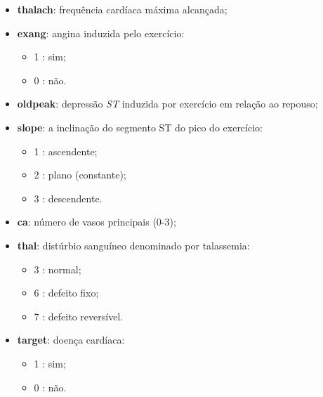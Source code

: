 \documentclass[a4paper]{report}
\begin{document}
{\begin{itemize}
\begin{itemize}
		\end{itemize}
	    \item \textbf{thalach}: frequência cardíaca máxima alcançada;
		\item \textbf{exang}: angina induzida pelo exercício:
		\begin{itemize}
			\item 1 : sim;
			\item 0 : não.
		\end{itemize}
	    \item \textbf{oldpeak}: depressão \textit{ST} induzida por exercício em relação ao repouso;
	    \item \textbf{slope}: a inclinação do segmento ST do pico do exercício:
	    \begin{itemize}
			\item 1 : ascendente;
			\item 2 : plano (constante);
			\item 3 : descendente.
		\end{itemize}
	    \item \textbf{ca}: número de vasos principais (0-3);
		\item \textbf{thal}: distúrbio sanguíneo denominado por talassemia:
		\begin{itemize}
			\item 3 : normal;
			\item 6 : defeito fixo;
			\item 7 : defeito reversível.
		\end{itemize}
	    \item \textbf{target}: doença cardíaca:
	    \begin{itemize}
			\item 1 : sim;
			\item 0 : não.
		\end{itemize}
    \end{itemize}
	
}
\end{document}
